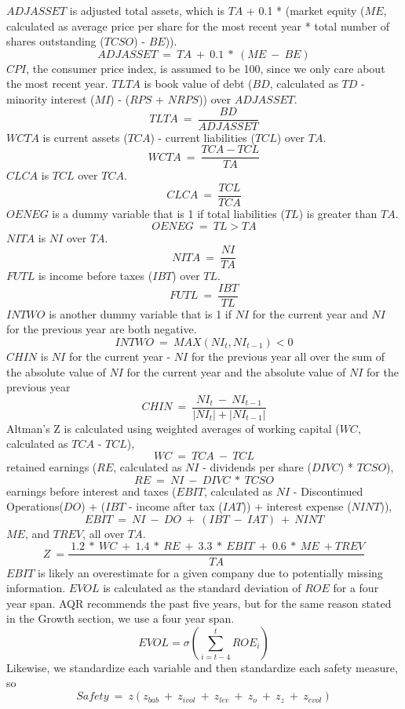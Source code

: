 \documentclass[titlepage]{article}
\begin{document}
$ADJASSET$ is adjusted total assets, which is $TA$ + 0.1 * (market equity ($ME$, calculated as average price per share for the most recent year * total number of shares outstanding ($TCSO$) - $BE$)). $$ADJASSET \ = \ TA \ + \ 0.1 \ * \ (ME \ - \ BE)$$ $CPI$, the consumer price index, is assumed to be 100, since we only care about the most recent year. $TLTA$ is book value of debt ($BD$, calculated as $TD$ - minority interest ($MI$) - ($RPS$ + $NRPS$)) over $ADJASSET$. $$TLTA \ = \ \frac{BD}{ADJASSET}$$ $WCTA$ is current assets ($TCA$) - current liabilities ($TCL$) over $TA$. $$WCTA \ = \ \frac{TCA - TCL}{TA}$$ $CLCA$ is $TCL$ over $TCA$. $$ CLCA \ = \ \frac{TCL}{TCA}$$ $OENEG$ is a dummy variable that is 1 if total liabilities ($TL$) is greater than $TA$. $$ OENEG \ = \ TL > TA $$ $NITA$ is $NI$ over $TA$. $$NITA \ = \ \frac{NI}{TA}$$ $FUTL$ is income before taxes ($IBT$) over $TL$. $$FUTL \ = \ \frac{IBT}{TL}$$ $INTWO$ is another dummy variable that is 1 if $NI$ for the current year and $NI$ for the previous year are both negative. $$INTWO \ = \ MAX(NI_t,NI_{t-1}) < 0$$ $CHIN$ is $NI$ for the current year - $NI$ for the previous year all over the sum of the absolute value of $NI$ for the current year and the absolute value of $NI$ for the previous year $$CHIN \ = \ \frac{NI_t \ - \ NI_{t-1}}{|NI_t| + |NI_{t-1}|}$$ Altman's Z is calculated using weighted averages of working capital ($WC$, calculated as $TCA$ - $TCL$), $$WC \ = \ TCA \ - \ TCL$$ retained earnings ($RE$, calculated as $NI$ - dividends per share ($DIVC$) * $TCSO$), $$RE \ = \ NI \ - \ DIVC \ * \ TCSO$$ earnings before interest and taxes ($EBIT$, calculated as $NI$ - Discontinued Operations($DO$) + ($IBT$ - income after tax ($IAT$)) + interest expense ($NINT$)), $$ EBIT \ = \ NI \ - \ DO \ + \ (IBT \ - \ IAT) \ + \ NINT $$ $ME$, and $TREV$, all over $TA$. $$Z \ = \frac{\ 1.2 \ * \ WC \ + \ 1.4 \ * \ RE \ + \ 3.3 \ * \ EBIT \ + \ 0.6 \ * \ ME \ + TREV}{TA}$$ $EBIT$ is likely an overestimate for a given company due to potentially missing information. $EVOL$ is calculated as the standard deviation of $ROE$ for a four year span. AQR recommends the past five years, but for the same reason stated in the Growth section, we use a four year span. $$EVOL = \sigma\left(\sum_{i=t-4}^{t}ROE_i\right)$$ Likewise, we standardize each variable and then standardize each safety measure, so $$Safety \ = \ z(z_{bab} \ + \ z_{ivol} \ + \ z_{lev} \ + \ z_{o} \ + \ z_{z} \ + \ z_{evol})$$ 
\end{document}
